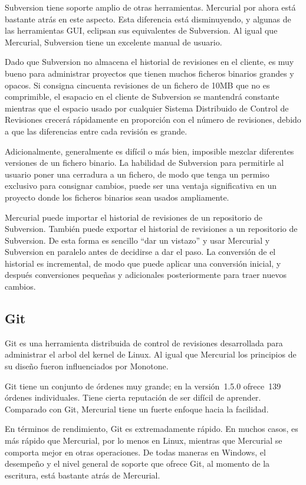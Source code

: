 Subversion tiene soporte amplio de otras herramientas. Mercurial por
ahora está bastante atrás en este aspecto.  Esta diferencia está
disminuyendo, y algunas de las herramientas GUI, eclipsan sus equivalentes de Subversion. Al igual
que Mercurial, Subversion tiene un excelente manual de usuario.

Dado que Subversion no almacena el historial de revisiones en el
cliente, es muy bueno para administrar proyectos que tienen muchos
ficheros binarios grandes y opacos. Si consigna cincuenta revisiones
de un fichero de 10MB que no es comprimible, el esapacio en el cliente
de Subversion se mantendrá constante mientras que el espacio usado por
cualquier Sistema Distribuido de Control de Revisiones crecerá
rápidamente en proporción con el número de revisiones, debido a que
las diferencias entre cada revisión es grande.

Adicionalmente, generalmente es difícil o más bien, imposible mezclar
diferentes versiones de un fichero binario. La habilidad de Subversion
para permitirle al usuario poner una cerradura  a un fichero, de modo
que tenga un permiso exclusivo para consignar cambios, puede ser una
ventaja significativa en un proyecto donde los ficheros binarios sean
usados ampliamente.

Mercurial puede importar el historial de revisiones de un repositorio
de Subversion. También puede exportar el historial de revisiones a un
repositorio de Subversion.  De esta forma es sencillo ``dar un
vistazo'' y usar Mercurial y Subversion en paralelo antes de decidirse
a dar el paso. La conversión de el historial es incremental, de modo
que puede aplicar una conversión inicial, y después conversiones
pequeñas y adicionales posteriormente para traer nuevos cambios.

\subsection{Git}

Git es una herramienta distribuida de control de revisiones
desarrollada para administrar el arbol del kernel de Linux.  Al igual
que Mercurial los principios de su diseño fueron influenciados por 
Monotone.

Git tiene un conjunto de órdenes muy grande; en la versión~1.5.0
ofrece~139 órdenes individuales.  Tiene cierta reputación de ser
difícil de aprender. Comparado con Git, Mercurial tiene un fuerte
enfoque hacia la facilidad.

En términos de rendimiento, Git es extremadamente rápido. En muchos
casos, es más rápido que Mercurial, por lo menos en Linux, mientras
que Mercurial se comporta mejor en otras operaciones.  De todas
maneras en Windows, el desempeño y el nivel general de soporte que
ofrece Git, al momento de la escritura, está bastante atrás de
Mercurial.


